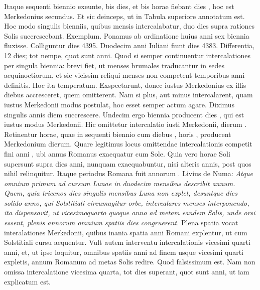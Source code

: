 Itaque sequenti biennio
exeunte, bis  dies, et bis  horae fiebant dies ,
 hoc
est Merkedonius secundus.
Et sic deinceps, ut in Tabula superiore
annotatum est.
Hoc modo singulis bienniis, quibus mensis intercalabatur,
duo dies supra rationes Solis succrescebant.
Exemplum.
%
Ponamus ab ordinatione huius anni sex biennia fluxisse.
Colliguntur
dies 4395.
Duodecim anni Iuliani fiunt dies 4383.
Differentia, 12 dies; tot nempe, quot sunt anni.
Quod si semper
continuentur intercalationes per singula biennia: brevi fiet,
ut menses brumales traducantur in sedes aequinoctiorum, et sic
vicissim reliqui menses non competent temporibus anni definitis.
Hoc ita temperatum. Exspectarunt, donec iustus Merkedonius
ex illis diebus accresceret, quem omitterent.
Nam si
plus, aut minus intercalarent, quam iustus Merkedonii modus postulat,
hoc esset semper actum agare.
Diximus singulis annis diem
succrescere.
Undecim ergo biennia producent dies , qui est iustus
modus Merkedonii.
Hic omittetur intercalatio iusti Merkedonii,
dierum .
Retinentur  horae, quae in sequenti biennio cum
diebus , horis , producent Merkedonium  dierum.
Quare legitimus locus omittendae intercalationis competit fini anni
, ubi annus Romanus exaequatur cum Sole.
Quia vero  horae
Soli supersunt supra dies anni, nunquam exaequabuntur, nisi alteris
 annis, post quos nihil relinquitur.
Itaque periodus
Romana fuit annorum .
Livius de Numa: \textit{Atque omnium
primum ad cursum Lunae in duodecim mensibus describit annum.}
\textit{Quem,
quia tricenos dies singulis mensibus Luna non explet, desuntque dies
solido anno, qui Solstitiali circumagitur orbe,
 intercalares menses interponendo,
ita dispensavit, ut vicesimoquarto quoque anno ad metam
eandem Solis, unde orsi essent, plenis annorum omnium spatiis dies congruerent.}
Plena spatia vocat interalationes Merkedonii, quibus inania
spatia anni Romani explentur, ut cum Solstitiali cursu aequentur.
Vult autem interventu intercalationis vicesimi quarti anni, et, ut
ipse loquitur, omnibus spatiis anni ad finem usque vicesimi quarti
expletis, annum Romanum ad metas Solis redire.
Quod falsissimum
est.
Nam non omissa intercalatione vicesima quarta, tot dies
superant, quot sunt anni, ut iam explicatum est.
